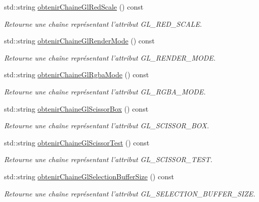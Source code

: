 \begin{DoxyCompactItemize}
std\-::string \hyperlink{group__utilitaire_gae20713f3668cb6be662849b8de30d623}{obtenir\-Chaine\-Gl\-Red\-Scale} () const 
\begin{DoxyCompactList}\small\item\em Retourne une chaîne représentant l'attribut G\-L\-\_\-\-R\-E\-D\-\_\-\-S\-C\-A\-L\-E. \end{DoxyCompactList}\item 
std\-::string \hyperlink{group__utilitaire_ga64d9bf10216007aeb301d43ac14f82b4}{obtenir\-Chaine\-Gl\-Render\-Mode} () const 
\begin{DoxyCompactList}\small\item\em Retourne une chaîne représentant l'attribut G\-L\-\_\-\-R\-E\-N\-D\-E\-R\-\_\-\-M\-O\-D\-E. \end{DoxyCompactList}\item 
std\-::string \hyperlink{group__utilitaire_ga1596849dfe7b4606e0fc3ff9fbe00489}{obtenir\-Chaine\-Gl\-Rgba\-Mode} () const 
\begin{DoxyCompactList}\small\item\em Retourne une chaîne représentant l'attribut G\-L\-\_\-\-R\-G\-B\-A\-\_\-\-M\-O\-D\-E. \end{DoxyCompactList}\item 
std\-::string \hyperlink{group__utilitaire_ga58f683f150a231ec839aed3f79cd3ef2}{obtenir\-Chaine\-Gl\-Scissor\-Box} () const 
\begin{DoxyCompactList}\small\item\em Retourne une chaîne représentant l'attribut G\-L\-\_\-\-S\-C\-I\-S\-S\-O\-R\-\_\-\-B\-O\-X. \end{DoxyCompactList}\item 
std\-::string \hyperlink{group__utilitaire_ga80ed5d63c763521b6db8166033008a6a}{obtenir\-Chaine\-Gl\-Scissor\-Test} () const 
\begin{DoxyCompactList}\small\item\em Retourne une chaîne représentant l'attribut G\-L\-\_\-\-S\-C\-I\-S\-S\-O\-R\-\_\-\-T\-E\-S\-T. \end{DoxyCompactList}\item 
std\-::string \hyperlink{group__utilitaire_gae47f276d2d1d8233f544fca09b062e63}{obtenir\-Chaine\-Gl\-Selection\-Buffer\-Size} () const 
\begin{DoxyCompactList}\small\item\em Retourne une chaîne représentant l'attribut G\-L\-\_\-\-S\-E\-L\-E\-C\-T\-I\-O\-N\-\_\-\-B\-U\-F\-F\-E\-R\-\_\-\-S\-I\-Z\-E. \end{DoxyCompactList}\item 

\end{DoxyCompactItemize}
